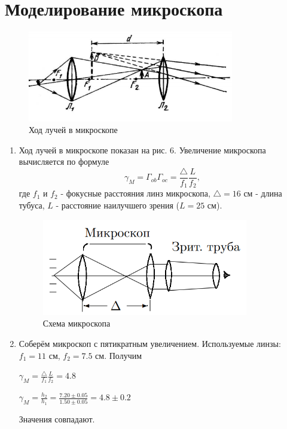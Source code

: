 \section*{Моделирование микроскопа}

    \begin{figure}[h]
    \centering
    \includegraphics[width=9cm]{micro.PNG}
    \caption{Ход лучей в микроскопе}
    \label{fig:vac}
\end{figure}

\begin{enumerate}
    \item Ход лучей в микроскопе показан на рис. 6. Увеличение микроскопа вычисляется по формуле
    \begin{equation}
        \gamma_M = \Gamma_{ob} \Gamma_{oc} = \frac{\triangle}{f_1} \frac{L}{f_2},
    \end{equation}
    где $f_1$ и $f_2$ - фокусные расстояния линз микроскопа, $\triangle = 16$ см - длина тубуса, $L$ - расстояние наилучшего зрения ($L = 25$ см).
    
    \begin{figure}[h]
    \centering
    \includegraphics[width=9cm]{micro_2.PNG}
    \caption{Схема микроскопа}
    \label{fig:vac}
\end{figure}    
    
    \item Соберём микроскоп с пятикратным увеличением. Используемые линзы: $f_1 = 11$ см, $f_2 = 7.5$ см. Получим
    \begin{center}
        $\gamma_M = \frac{\triangle}{f_1} \frac{L}{f_2} = 4.8$ \par
        $\gamma_M = \frac{h_2}{h_1} = \frac{7.20\pm0.05}{1.50\pm0.05} = 4.8 \pm 0.2$
    \end{center}
Значения совпадают.
\end{enumerate}

